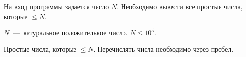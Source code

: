 На вход программы задается число $N$. Необходимо вывести все простые числа, которые $\leq N$. 

\InputFile

$N$~---~натуральное положительное число. $N \leq 10^5$.

\OutputFile

Простые числа, которые $\leq N$. Перечислять числа необходимо через пробел.

\SAMPLES

